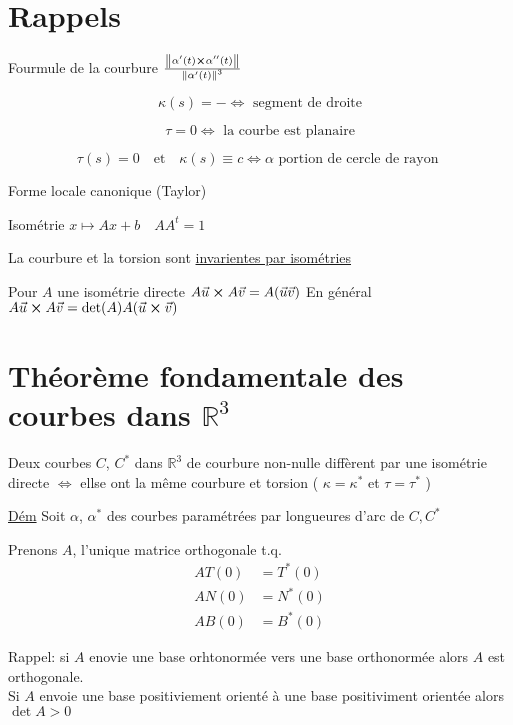 



\section*{Rappels}

Fourmule de la courbure $\frac{\norm{\alpha'(t) \cross \alpha''(t)}}{\norm{\alpha'(t)}^3}$

$$\kappa(s)=- \iff \text{ segment de droite}$$ 

$$\tau =0 \iff \text{ la courbe est planaire}$$ 

$$\tau(s) = 0 \quad\text{et}\quad \kappa(s)\equiv c \iff \alpha \text{ portion de cercle de rayon }$$ 

Forme locale canonique (Taylor)

Isométrie $x \mapsto Ax+b \quad AA^t = 1$

La courbure et la torsion sont \underline{invarientes par isométries}

Pour $A$ une isométrie directe $A\vec u \cross A\vec v = A (\vec u \vec v)$ 
En général $A\vec u \cross A \vec v = \det(A) A(\vec u \cross \vec v)$

\section*{Théorème fondamentale des courbes dans $\mathbb{R}^3$}

Deux courbes $C$, $C^*$ dans $\mathbb{R}^3$ de courbure non-nulle diffèrent par une isométrie directe $\iff$ ellse ont la même courbure et torsion ( $\kappa = \kappa^*$ et $\tau = \tau^*$ )

\underline{Dém}
Soit $\alpha$, $\alpha^*$ des courbes paramétrées par longueures d'arc de $C,C^*$

Prenons $A$, l'unique matrice orthogonale t.q. $$ \begin{aligned}AT(0) &= T^*(0)\\AN(0) &= N^*(0)\\AB(0) &= B^*(0)\end{aligned}$$ 

\begin{tcolorbox}
	Rappel: si $A$ enovie une base orhtonormée vers une base orthonormée alors $A$ est orthogonale.\\	
	Si $A$ envoie une base positiviement orienté à une base positiviment orientée alors $\det{A} > 0$ 
\end{tcolorbox}

